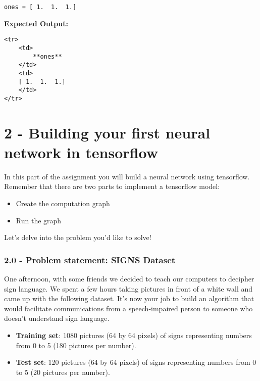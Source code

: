\documentclass[11pt]{article}
\providecommand{\tightlist}{%
      \setlength{\itemsep}{0pt}\setlength{\parskip}{0pt}}
\begin{document}
    \begin{Verbatim}[commandchars=\\\{\}]
ones = [ 1.  1.  1.]

    \end{Verbatim}

    \textbf{Expected Output:}

\begin{verbatim}
<tr> 
    <td>
        **ones**
    </td>
    <td>
    [ 1.  1.  1.]
    </td>
</tr>
\end{verbatim}

    \section{2 - Building your first neural network in
tensorflow}\label{building-your-first-neural-network-in-tensorflow}

In this part of the assignment you will build a neural network using
tensorflow. Remember that there are two parts to implement a tensorflow
model:

\begin{itemize}
\tightlist
\item
  Create the computation graph
\item
  Run the graph
\end{itemize}

Let's delve into the problem you'd like to solve!

\subsubsection{2.0 - Problem statement: SIGNS
Dataset}\label{problem-statement-signs-dataset}

One afternoon, with some friends we decided to teach our computers to
decipher sign language. We spent a few hours taking pictures in front of
a white wall and came up with the following dataset. It's now your job
to build an algorithm that would facilitate communications from a
speech-impaired person to someone who doesn't understand sign language.

\begin{itemize}
\tightlist
\item
  \textbf{Training set}: 1080 pictures (64 by 64 pixels) of signs
  representing numbers from 0 to 5 (180 pictures per number).
\item
  \textbf{Test set}: 120 pictures (64 by 64 pixels) of signs
  representing numbers from 0 to 5 (20 pictures per number).
\end{itemize}
\end{document}
